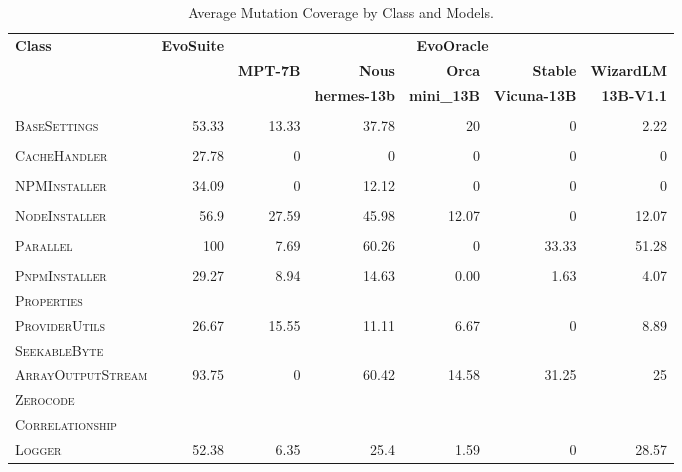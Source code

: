 \begin{table}[H]
\centering

\begin{tabular}{| l | r | r | r | r | r | r |}
\hline
\multirow{2}{*}{\textbf{Class}} & \multirow{2}{*}{\textbf{EvoSuite}} & \multicolumn{5}{c|}{\textbf{EvoOracle}} \\ %
\cline{3-7} %
 &  & \textbf{MPT-7B} & \textbf{Nous} & \textbf{Orca} & \textbf{Stable} & \textbf{WizardLM} \\
 &  &  & \textbf{hermes-13b} & \textbf{mini\_13B} & \textbf{Vicuna-13B} & \textbf{13B-V1.1} \\
\hline
\scriptsize\textsc{} &  &  &  &  &  &  \\
\scriptsize\textsc{BaseSettings} & 53.33 & 13.33 & 37.78 & 20 & 0 & 2.22 \\
\hline
\scriptsize\textsc{} &  &  &  &  &  &  \\
\scriptsize\textsc{CacheHandler} & 27.78 & 0 & 0 & 0 & 0 & 0 \\
\hline
\scriptsize\textsc{} &  &  &  &  &  &  \\
\scriptsize\textsc{NPMInstaller} & 34.09 & 0 & 12.12 & 0 & 0 & 0 \\
\hline
\scriptsize\textsc{} &  &  &  &  &  &  \\
\scriptsize\textsc{NodeInstaller} & 56.9 & 27.59 & 45.98 & 12.07 & 0 & 12.07 \\
\hline
\scriptsize\textsc{} &  &  &  &  &  &  \\
\scriptsize\textsc{Parallel} & 100 & 7.69 & 60.26 & 0 & 33.33 & 51.28 \\
\hline
\scriptsize\textsc{} &  &  &  &  &  &  \\
\scriptsize\textsc{PnpmInstaller} & 29.27 & 8.94 & 14.63 & 0.00 & 1.63 & 4.07 \\
\hline
\scriptsize\textsc{Properties} &  &  &  &  &  &  \\
\scriptsize\textsc{ProviderUtils} & 26.67 & 15.55 & 11.11 & 6.67 & 0 & 8.89 \\
\hline
\scriptsize\textsc{SeekableByte} &  &  &  &  &  &  \\
\scriptsize\textsc{ArrayOutputStream} & 93.75 & 0 & 60.42 & 14.58 & 31.25 & 25 \\
\hline
\scriptsize\textsc{Zerocode} &  &  &  &  &  &  \\
\scriptsize\textsc{Correlationship} &  &  &  &  &  &  \\
\scriptsize\textsc{Logger} & 52.38 & 6.35 & 25.4 & 1.59 & 0 & 28.57 \\
\hline

\end{tabular}
\caption{Average Mutation Coverage by Class and Models.}
\label{tab:mutation_coverage}
\end{table}

